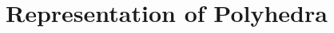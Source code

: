 \documentclass[main]{subfiles}
\begin{document}

\section{Representation of Polyhedra}
\end{document}
